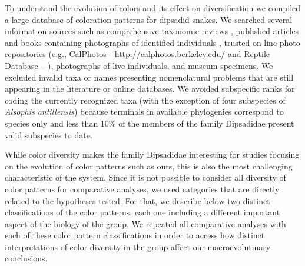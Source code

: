 To understand the evolution of colors and its effect on diversification we compiled a large database of coloration patterns for dipsadid snakes. We searched several information sources such as comprehensive taxonomic reviews \citep[e.g.,][]{downs_1967}, published articles and books containing photographs of identified individuals \citep[e.g.,][]{savage_2002, campbell_lamar_2004}, trusted on-line photo repositories (e.g., CalPhotos - http://calphotos.berkeley.edu/ and Reptile Database – \citealp{uetz_2014}), photographs of live individuals, and museum specimens. We excluded invalid taxa or names presenting nomenclatural problems that are still appearing in the literature or online databases. We avoided subspecific ranks for coding the currently recognized taxa (with the exception of four subspecies of \textit{Alsophis antillensis}) because terminals in available phylogenies correspond to species only and less than 10\% of the members of the family Dipsadidae present valid subspecies to date.

While color diversity makes the family Dipsadidae interesting for studies focusing on the evolution of color patterns such as ours, this is also the most challenging characteristic of the system. Since it is not possible to consider all diversity of color patterns for comparative analyses, we used categories that are directly related to the hypotheses tested. For that, we describe below two distinct classifications of the color patterns, each one including a different important aspect of the biology of the group. We repeated all comparative analyses with each of these color pattern classifications in order to access how distinct interpretations of color diversity in the group affect our macroevolutinary conclusions.

